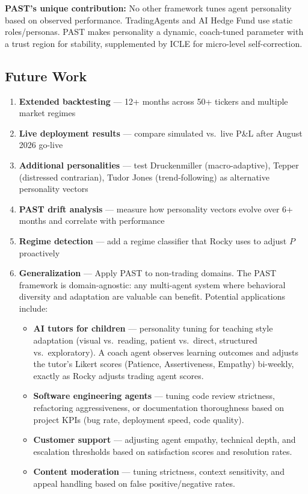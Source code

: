 \documentclass[11pt]{article}
\providecommand{\tightlist}{\setlength{\itemsep}{0pt}\setlength{\parskip}{0pt}}
\begin{document}
\textbf{PAST's unique contribution:} No other framework tunes agent personality based on observed performance. TradingAgents and AI Hedge Fund use static roles/personas. PAST makes personality a dynamic, coach-tuned parameter with a trust region for stability, supplemented by ICLE for micro-level self-correction.

\subsection{Future Work}\label{future-work}

\begin{enumerate}
\def\labelenumi{\arabic{enumi}.}
\tightlist
\item
  \textbf{Extended backtesting} --- 12+ months across 50+ tickers and multiple market regimes
\item
  \textbf{Live deployment results} --- compare simulated vs.~live P\&L after August 2026 go-live
\item
  \textbf{Additional personalities} --- test Druckenmiller (macro-adaptive), Tepper (distressed contrarian), Tudor Jones (trend-following) as alternative personality vectors
\item
  \textbf{PAST drift analysis} --- measure how personality vectors evolve over 6+ months and correlate with performance
\item
  \textbf{Regime detection} --- add a regime classifier that Rocky uses to adjust \(P\) proactively
\item
  \textbf{Generalization} --- Apply PAST to non-trading domains. The PAST framework is domain-agnostic: any multi-agent system where behavioral diversity and adaptation are valuable can benefit. Potential applications include:

  \begin{itemize}
  \tightlist
  \item
    \textbf{AI tutors for children} --- personality tuning for teaching style adaptation (visual vs.~reading, patient vs.~direct, structured vs.~exploratory). A coach agent observes learning outcomes and adjusts the tutor's Likert scores (Patience, Assertiveness, Empathy) bi-weekly, exactly as Rocky adjusts trading agent scores.
  \item
    \textbf{Software engineering agents} --- tuning code review strictness, refactoring aggressiveness, or documentation thoroughness based on project KPIs (bug rate, deployment speed, code quality).
  \item
    \textbf{Customer support} --- adjusting agent empathy, technical depth, and escalation thresholds based on satisfaction scores and resolution rates.
  \item
    \textbf{Content moderation} --- tuning strictness, context sensitivity, and appeal handling based on false positive/negative rates.
  \end{itemize}
\end{enumerate}
\end{document}
